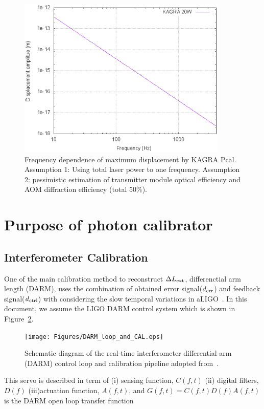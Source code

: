 \begin{figure}
\begin{center}
\includegraphics[width=10cm]{Figures/pcal_disp.eps}
\caption{Frequency dependence of maximum displacement by KAGRA Pcal. 
Assumption 1: Using total laser power to one frequency.
Assumption 2: pessimistic estimation of transmitter module optical efficiency and 
AOM diffraction efficiency (total 50$\%$). }
\label{fig:kagra_pcal_displacement} 
\end{center}
\end{figure}



 

\section{Purpose of photon calibrator}
\subsection{Interferometer Calibration}\label{sec:darm_calib}

One of the main calibration method to reconstruct $\Delta L_{\rm ext}$, differenctial arm length (DARM), 
uses the combination of obtained error signal($d_{\rm err}$) and feedback signal($d_{\rm ctrl}$) 
with considering the slow temporal variations in 
aLIGO~\cite{LIGO-CAL,Tuyenbayev}.
In this document, we assume the LIGO DARM control system which is shown in Figure~\ref{fig:L_DARM_control_loop}.
\begin{figure}
\begin{center}
\texttt{[image: Figures/DARM\_loop\_and\_CAL.eps]}
\caption{Schematic diagram of the real-time interferometer differential 
arm (DARM) control loop and calibration pipeline adopted 
from~\cite{LIGO-CAL,Tuyenbayev}.}
\label{fig:L_DARM_control_loop} 
\end{center}
\end{figure}
This servo is described in term of 
(i) sensing function, $C(f,t)$ 
(ii) digital filters, $D(f)$ 
(iii)actuation function, $A(f,t)$, 
and $G(f,t) = C(f,t)D(f)A(f,t)$ is the DARM open loop transfer function  

